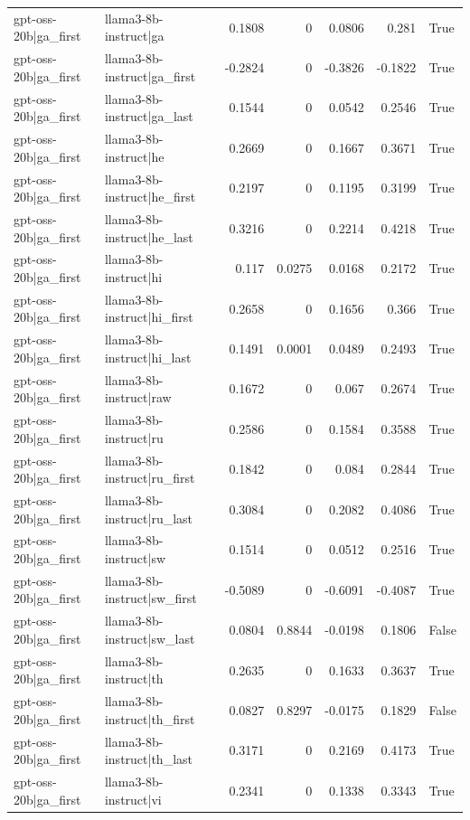 \begin{table}
\begin{tabular}{l l r r r r l}
gpt-oss-20b|ga_first & llama3-8b-instruct|ga & 0.1808 & 0 & 0.0806 & 0.281 & True \\
gpt-oss-20b|ga_first & llama3-8b-instruct|ga_first & -0.2824 & 0 & -0.3826 & -0.1822 & True \\
gpt-oss-20b|ga_first & llama3-8b-instruct|ga_last & 0.1544 & 0 & 0.0542 & 0.2546 & True \\
gpt-oss-20b|ga_first & llama3-8b-instruct|he & 0.2669 & 0 & 0.1667 & 0.3671 & True \\
gpt-oss-20b|ga_first & llama3-8b-instruct|he_first & 0.2197 & 0 & 0.1195 & 0.3199 & True \\
gpt-oss-20b|ga_first & llama3-8b-instruct|he_last & 0.3216 & 0 & 0.2214 & 0.4218 & True \\
gpt-oss-20b|ga_first & llama3-8b-instruct|hi & 0.117 & 0.0275 & 0.0168 & 0.2172 & True \\
gpt-oss-20b|ga_first & llama3-8b-instruct|hi_first & 0.2658 & 0 & 0.1656 & 0.366 & True \\
gpt-oss-20b|ga_first & llama3-8b-instruct|hi_last & 0.1491 & 0.0001 & 0.0489 & 0.2493 & True \\
gpt-oss-20b|ga_first & llama3-8b-instruct|raw & 0.1672 & 0 & 0.067 & 0.2674 & True \\
gpt-oss-20b|ga_first & llama3-8b-instruct|ru & 0.2586 & 0 & 0.1584 & 0.3588 & True \\
gpt-oss-20b|ga_first & llama3-8b-instruct|ru_first & 0.1842 & 0 & 0.084 & 0.2844 & True \\
gpt-oss-20b|ga_first & llama3-8b-instruct|ru_last & 0.3084 & 0 & 0.2082 & 0.4086 & True \\
gpt-oss-20b|ga_first & llama3-8b-instruct|sw & 0.1514 & 0 & 0.0512 & 0.2516 & True \\
gpt-oss-20b|ga_first & llama3-8b-instruct|sw_first & -0.5089 & 0 & -0.6091 & -0.4087 & True \\
gpt-oss-20b|ga_first & llama3-8b-instruct|sw_last & 0.0804 & 0.8844 & -0.0198 & 0.1806 & False \\
gpt-oss-20b|ga_first & llama3-8b-instruct|th & 0.2635 & 0 & 0.1633 & 0.3637 & True \\
gpt-oss-20b|ga_first & llama3-8b-instruct|th_first & 0.0827 & 0.8297 & -0.0175 & 0.1829 & False \\
gpt-oss-20b|ga_first & llama3-8b-instruct|th_last & 0.3171 & 0 & 0.2169 & 0.4173 & True \\
gpt-oss-20b|ga_first & llama3-8b-instruct|vi & 0.2341 & 0 & 0.1338 & 0.3343 & True \\

\end{tabular}
\end{table}
